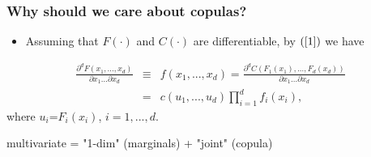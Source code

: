 \documentclass[pdf,9pt,xcolor=dvipsnames,hide notes]{beamer}
\begin{document}
\begin{frame}[label=frame2]
\frametitle{Why should we care about copulas?}


	\begin{itemize}
		\justifying
		
		\item Assuming that $F\left( \cdot \right) $ and $C\left( \cdot
		\right) $ are differentiable, by $\left( \ref{1}\right)$ we have
		
	\end{itemize}
	
	\begin{eqnarray}
	\frac{\partial ^{d}F\left( x_{1},...,x_{d}\right) }{\partial
		x_{1}...\partial x_{d}} &\equiv &f\left( x_{1},...,x_{d}\right) =\frac{
		\partial ^{d}C\left( F_{1}\left( x_{1}\right) ,...,F_{d}\left( x_{d}\right)
		\right) }{\partial x_{1}...\partial x_{d}} \\
	&=&c\left( u_{1},...,u_{d}\right) \prod_{i=1}^{d}f_{i}\left( x_{i}\right),
	\label{23}
	\end{eqnarray}%
	where $u_{i}$=$F_{i}\left( x_{i}\right) $, $i=1,...,d$.
	
	\vspace{0.3cm}
	\pause
	
	\begin{exampleblock}{}
		\centering
	multivariate = "1-dim" (marginals) + "joint" (copula)	
	\end{exampleblock}
	

\end{frame}
\end{document}
